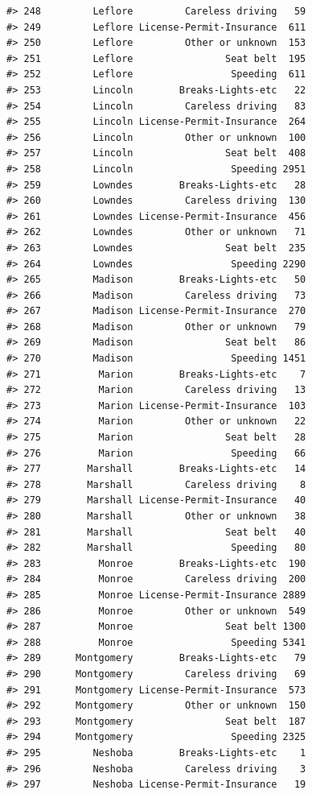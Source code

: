 \documentclass[
]{book}
\begin{document}
\begin{verbatim}
#> 248         Leflore         Careless driving   59
#> 249         Leflore License-Permit-Insurance  611
#> 250         Leflore         Other or unknown  153
#> 251         Leflore                Seat belt  195
#> 252         Leflore                 Speeding  611
#> 253         Lincoln        Breaks-Lights-etc   22
#> 254         Lincoln         Careless driving   83
#> 255         Lincoln License-Permit-Insurance  264
#> 256         Lincoln         Other or unknown  100
#> 257         Lincoln                Seat belt  408
#> 258         Lincoln                 Speeding 2951
#> 259         Lowndes        Breaks-Lights-etc   28
#> 260         Lowndes         Careless driving  130
#> 261         Lowndes License-Permit-Insurance  456
#> 262         Lowndes         Other or unknown   71
#> 263         Lowndes                Seat belt  235
#> 264         Lowndes                 Speeding 2290
#> 265         Madison        Breaks-Lights-etc   50
#> 266         Madison         Careless driving   73
#> 267         Madison License-Permit-Insurance  270
#> 268         Madison         Other or unknown   79
#> 269         Madison                Seat belt   86
#> 270         Madison                 Speeding 1451
#> 271          Marion        Breaks-Lights-etc    7
#> 272          Marion         Careless driving   13
#> 273          Marion License-Permit-Insurance  103
#> 274          Marion         Other or unknown   22
#> 275          Marion                Seat belt   28
#> 276          Marion                 Speeding   66
#> 277        Marshall        Breaks-Lights-etc   14
#> 278        Marshall         Careless driving    8
#> 279        Marshall License-Permit-Insurance   40
#> 280        Marshall         Other or unknown   38
#> 281        Marshall                Seat belt   40
#> 282        Marshall                 Speeding   80
#> 283          Monroe        Breaks-Lights-etc  190
#> 284          Monroe         Careless driving  200
#> 285          Monroe License-Permit-Insurance 2889
#> 286          Monroe         Other or unknown  549
#> 287          Monroe                Seat belt 1300
#> 288          Monroe                 Speeding 5341
#> 289      Montgomery        Breaks-Lights-etc   79
#> 290      Montgomery         Careless driving   69
#> 291      Montgomery License-Permit-Insurance  573
#> 292      Montgomery         Other or unknown  150
#> 293      Montgomery                Seat belt  187
#> 294      Montgomery                 Speeding 2325
#> 295         Neshoba        Breaks-Lights-etc    1
#> 296         Neshoba         Careless driving    3
#> 297         Neshoba License-Permit-Insurance   19

\end{verbatim}
\end{document}
